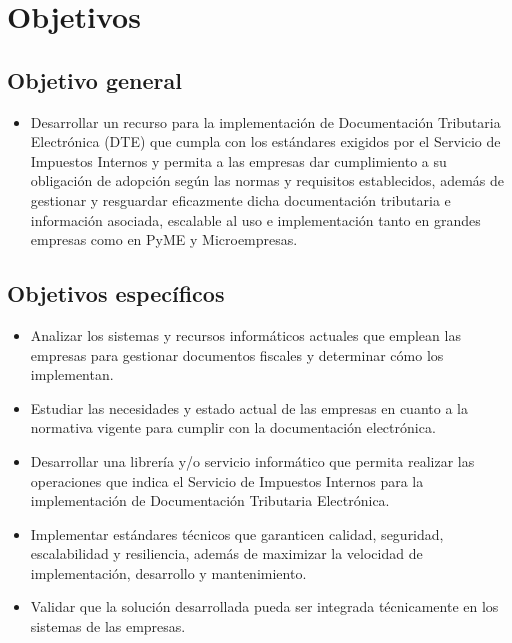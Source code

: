 \section{Objetivos}

\subsection{Objetivo general}

\begin{itemize} 
    \item Desarrollar un recurso para la implementación de Documentación Tributaria Electrónica (DTE) que cumpla con los estándares exigidos por el Servicio de Impuestos Internos y permita a las empresas dar cumplimiento a su obligación de adopción según las normas y requisitos establecidos, además de gestionar y resguardar eficazmente dicha documentación tributaria e información asociada, escalable al uso e implementación tanto en grandes empresas como en PyME y Microempresas.
\end{itemize}

\subsection{Objetivos específicos}

\begin{itemize}
	\item Analizar los sistemas y recursos informáticos actuales que emplean las empresas para gestionar documentos fiscales y determinar cómo los implementan.
	\item Estudiar las necesidades y estado actual de las empresas en cuanto a la normativa vigente para cumplir con la documentación electrónica.
	\item Desarrollar una librería y/o servicio informático que permita realizar las operaciones que indica el Servicio de Impuestos Internos para la implementación de Documentación Tributaria Electrónica.
	\item Implementar estándares técnicos que garanticen calidad, seguridad, escalabilidad y resiliencia, además de maximizar la velocidad de implementación, desarrollo y mantenimiento.
	\item Validar que la solución desarrollada pueda ser integrada técnicamente en los sistemas de las empresas.
\end{itemize}